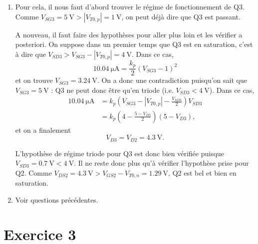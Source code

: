 \begin{enumerate}
	\item Pour cela, il nous faut d'abord trouver le régime de fonctionnement de Q3. Comme
	$V_{SG3} = \SI{5}{\volt} > |V_{T0,p}| = \SI{1}{\volt}$, on peut déjà dire que Q3 est passant.
	
	A nouveau, il faut faire des hypothèses pour aller plus loin et les vérifier a posteriori.
	On suppose dans un premier temps que Q3 est en saturation, c'est à dire que $V_{SD3} >
	V_{SG3} - |V_{T0,p}| = \SI{4}{\volt}$. Dans ce cas,
	\[ \SI{10.04}{\micro\ampere} = \frac{k_p}{2}(V_{SG3} - 1)^2 \]
	et on trouve $V_{SG3} = \SI{3.24}{\volt}$. On a donc une contradiction puisqu'on sait que
	$V_{SG3} = \SI{5}{\volt}$ : Q3 ne peut donc être qu'en triode (i.e. $V_{SD3} < \SI{4}{\volt}$).
	Dans ce cas,
	\begin{align*}
		\SI{10.04}{\micro\ampere} 	& = k_p(V_{SG3} - |V_{T0,p}| - \frac{V_{SD3}}{2})V_{SD3} \\
									& = k_p\left(4 - \frac{5 - V_{D3}}{2}\right)(5-V_{D3}),
	\end{align*}
	et on a finalement
	\[ V_{D3} = V_{D2} = \SI{4.3}{\volt}.\]
	
	L'hypothèse de régime triode pour Q3 est donc bien vérifiée puisque $V_{SD3} = \SI{0.7}{\volt} < 
	\SI{4}{\volt}$. Il ne reste donc plus qu'à vérifier l'hypothèse prise pour Q2. Comme
	$V_{DS2} = \SI{4.3}{\volt} > V_{GS2} - V_{T0,n} = \SI{1.29}{\volt}$, Q2 est bel et bien
	en saturation.
	
	\item Voir questions précédentes.
\end{enumerate}

\section{Exercice 3}

